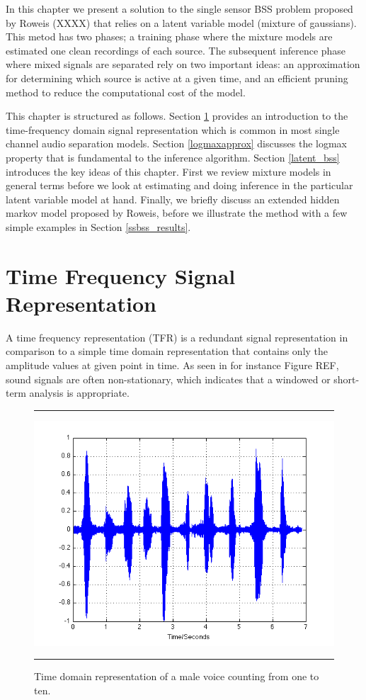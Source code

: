 \documentclass[11pt, oneside, a4paper]{report}
\begin{document}
In this chapter we present  a solution to the single sensor BSS
problem proposed by Roweis (XXXX)\cite{roweis} that relies on a
latent variable model (mixture of gaussians). This metod has two 
phases; a training phase where the mixture models are estimated
one clean recordings of each source. The subsequent inference 
phase where mixed signals are separated rely on two important ideas: an
approximation for determining which source is active at a given time,
and an efficient pruning method to reduce the computational cost
of the model.


This chapter is structured as follows. Section \ref{timeFreqRep}
provides an introduction to the time-frequency domain signal
representation which is common in most single channel audio separation
models. Section \ref{logmaxapprox} discusses the logmax property
that is fundamental to the inference algorithm. Section \ref{latent_bss}
introduces the key ideas of this chapter. First we review mixture models
in general terms before we look at estimating and doing inference in the 
particular latent variable model at hand. Finally, we briefly discuss an
extended hidden markov model proposed by Roweis, before we illustrate the
method with a few simple examples in Section \ref{ssbss_results}.



\section{Time Frequency Signal Representation}\label{timeFreqRep}


A time frequency representation (TFR) is a redundant signal
representation in comparison to a simple time domain representation that
contains only the amplitude values at given point in time. As seen in
for instance Figure REF, sound signals are often non-stationary,
which indicates that a windowed or short-term analysis is
appropriate. 


\begin{figure}
  \centering
  \hrule
  \includegraphics[width = .8\textwidth]{Figures/time_signal}
  \caption{Time domain representation of a male voice counting from
    one to ten.}
  \hrule
\end{figure}
\end{document}
